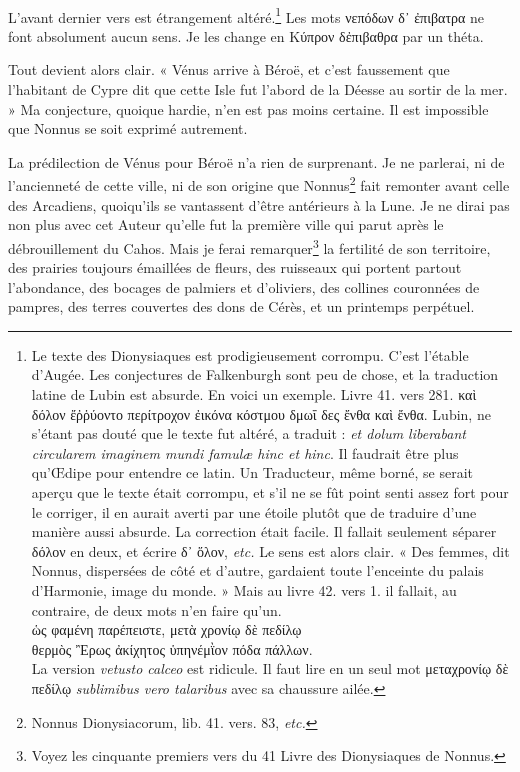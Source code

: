\documentclass[a4paper, 11pt, oneside, polutonikogreek, french]{article}
\begin{document}
\paragraph{}
L'avant dernier vers est étrangement altéré.\footnote{Le texte des Dionysiaques est prodigieusement corrompu. C'est l'étable d'Augée. Les conjectures de Falkenburgh sont peu de chose, et la traduction latine de Lubin est absurde. En voici un exemple. Livre 41. vers 281. καὶ δόλον ἔῤῥύοντο περίτροχον ἐικόνα κόστμου δμωΐ δες ἔνθα καὶ ἔνθα. Lubin, ne s'étant pas douté que le texte fut altéré, a traduit : \emph{et dolum liberabant circularem imaginem mundi famulæ hinc et hinc}. Il faudrait être plus qu'Œdipe pour entendre ce latin. Un Traducteur, même borné, se serait aperçu que le texte était corrompu, et s'il ne se fût point senti assez fort pour le corriger, il en aurait averti par une étoile plutôt que de traduire d'une manière aussi absurde. La correction était facile. Il fallait seulement séparer δόλον en deux, et écrire δ᾿ ὅλον, \emph{etc.} Le sens est alors clair. « Des femmes, dit Nonnus, dispersées de côté et d'autre, gardaient toute l'enceinte du palais d'Harmonie, image du monde. » Mais au livre 42. vers 1. il fallait, au contraire, de deux mots n'en faire qu'un.\\\hspace*{10mm}ὡς φαμένη παρέπειστε, μετὰ χρονίῳ δὲ πεδίλῳ\\\hspace*{10mm}θερμὸς Ἒρως ἀκίχητος ὑπηνέμῒον πόδα πάλλων.\\\hspace*{5mm}La version \emph{vetusto calceo} est ridicule. Il faut lire en un seul mot μεταχρονίῳ δὲ πεδίλῳ \emph{sublimibus vero talaribus} avec sa chaussure ailée.} Les mots νεπόδων δ᾽ ἐπιβατρα ne font absolument aucun sens. Je les change en Κύπρον δἐπιβαθρα par un théta.

Tout devient alors clair. « Vénus arrive à Béroë, et c'est faussement que l'habitant de Cypre dit que cette Isle fut l'abord de la Déesse au sortir de la mer. » Ma conjecture, quoique hardie, n'en est pas moins certaine. Il est impossible que Nonnus se soit exprimé autrement.

La prédilection de Vénus pour Béroë n'a rien de surprenant. Je ne parlerai, ni de l'ancienneté de cette ville, ni de son origine que Nonnus\footnote{Nonnus Dionysiacorum, lib. 41. vers. 83, \emph{etc.}} fait remonter avant celle des Arcadiens, quoiqu'ils se vantassent d'être antérieurs à la Lune. Je ne dirai pas non plus avec cet Auteur qu'elle fut la première ville qui parut après le débrouillement du Cahos. Mais je ferai remarquer\footnote{Voyez les cinquante premiers vers du 41 Livre des Dionysiaques de Nonnus.} la fertilité de son territoire, des prairies toujours émaillées de fleurs, des ruisseaux qui portent partout l'abondance, des bocages de palmiers et d'oliviers, des collines couronnées de pampres, des terres couvertes des dons de Cérès, et un printemps perpétuel.
\end{document}
